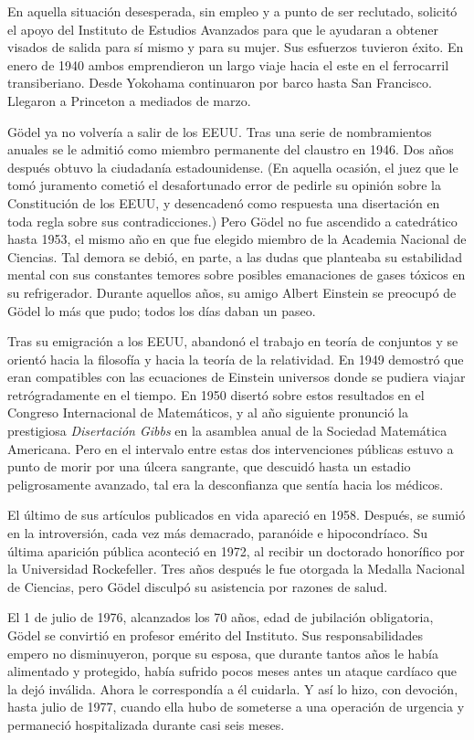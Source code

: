 \documentclass[a4paper, 12pt]{article}
\begin{document}
En aquella situación desesperada, sin empleo y a punto de ser reclutado, solicitó el apoyo del Instituto de Estudios Avanzados para que le ayudaran a obtener visados de salida para sí mismo y para su mujer. Sus esfuerzos tuvieron éxito. En enero de 1940 ambos emprendieron un largo viaje hacia el este en el ferrocarril transiberiano. Desde Yokohama continuaron por barco hasta San Francisco. Llegaron a Princeton
a mediados de marzo.

Gödel ya no volvería a salir de los EEUU. Tras una serie de nombramientos anuales se le admitió como miembro permanente del claustro en 1946. Dos años después obtuvo la ciudadanía estadounidense. (En aquella ocasión, el juez que le tomó juramento cometió el desafortunado error de pedirle su opinión sobre la Constitución de los EEUU, y desencadenó como respuesta una disertación en toda regla sobre sus contradicciones.) Pero Gödel no fue ascendido a catedrático hasta 1953, el mismo año en que fue elegido miembro de la Academia Nacional de Ciencias. Tal demora se debió, en parte, a las dudas que planteaba su estabilidad mental con sus constantes temores sobre posibles emanaciones de gases tóxicos en su refrigerador. Durante aquellos años, su amigo Albert Einstein se preocupó de Gödel lo más que pudo; todos los días daban un paseo.

Tras su emigración a los EEUU, abandonó el trabajo en teoría de conjuntos y se orientó hacia la filosofía y hacia la teoría de la relatividad. En 1949 demostró que eran compatibles con las ecuaciones de Einstein universos donde se pudiera viajar retrógradamente en el tiempo. En 1950 disertó sobre estos resultados en el Congreso Internacional de Matemáticos, y al año siguiente pronunció la prestigiosa {\it Disertación Gibbs} en la asamblea anual de la Sociedad Matemática Americana. Pero en el intervalo entre estas dos intervenciones públicas estuvo a punto de morir por una úlcera sangrante, que descuidó hasta un estadio peligrosamente avanzado, tal era la desconfianza que sentía hacia los médicos.

El último de sus artículos publicados en vida apareció en 1958. Después, se sumió en la introversión, cada vez más demacrado, paranóide e hipocondríaco. Su última aparición pública aconteció en 1972, al recibir un doctorado honorífico por la Universidad Rockefeller. Tres años después le fue otorgada la Medalla Nacional de Ciencias, pero Gödel disculpó su asistencia por razones de salud.

El 1 de julio de 1976, alcanzados los 70 años, edad de jubilación obligatoria, Gödel se convirtió en profesor emérito del Instituto. Sus responsabilidades empero no disminuyeron, porque su esposa, que durante tantos años le había alimentado y protegido, había sufrido pocos meses antes un ataque cardíaco que la dejó inválida. Ahora le correspondía a él cuidarla. Y así lo hizo, con devoción, hasta julio de 1977, cuando ella hubo de someterse a una operación de urgencia y permaneció hospitalizada durante casi seis meses.
\end{document}
